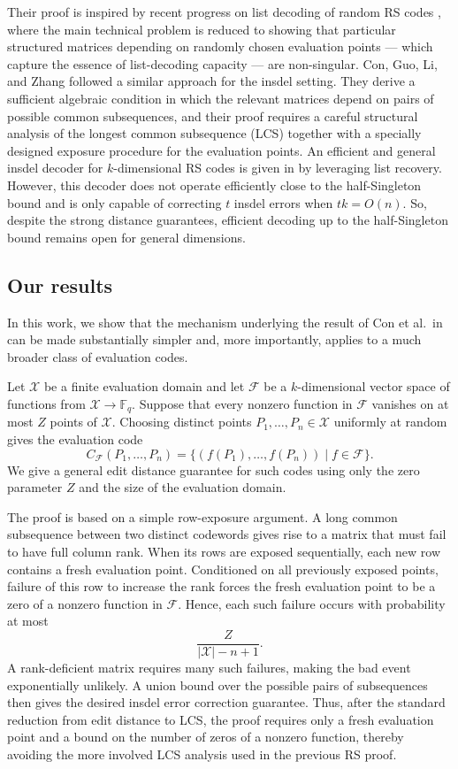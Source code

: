 \documentclass[draft, onecolumn, 11pt]{IEEEtran}
\newcommand{\F}{\mathbb{F}}
\begin{document}
Their proof is inspired by recent progress on list decoding of random RS codes \cite{brakensiek2023generic, GZ23, alrabiah2023randomly}, where the main technical problem is reduced to showing that particular structured matrices depending on randomly chosen evaluation points --- which capture the essence of list-decoding capacity --- are non-singular. Con, Guo, Li, and Zhang \cite{con2024randomRS} followed a similar approach for the insdel setting. They derive a sufficient algebraic condition in which the relevant matrices depend on pairs of possible common subsequences, and their proof requires a careful structural analysis of the longest common subsequence (LCS) together with a specially designed exposure procedure for the evaluation points. An efficient and general insdel decoder for $k$-dimensional RS codes is given in \cite{banerjee2025decoding} by leveraging list recovery. However, this decoder does not operate efficiently close to the half-Singleton bound and is only capable of correcting  $t$ insdel errors when $tk = O(n)$.
So, despite the strong distance guarantees, efficient decoding up to the half-Singleton bound remains open for general dimensions.

\subsection{Our results}
In this work, we show that the mechanism underlying the result of Con et al.\ in \cite{con2024randomRS} can be made substantially simpler and, more importantly, applies to a much broader class of evaluation codes.

Let $\mathcal{X}$ be a finite evaluation domain and let $\mathcal{F}$ be a $k$-dimensional vector space of functions from $\mathcal{X} \to \F_q$. Suppose that every nonzero function in $\mathcal{F}$ vanishes on at most $Z$ points of $\mathcal{X}$. Choosing distinct points $P_1, \dots, P_n \in \mathcal{X}$ uniformly at random gives the evaluation code
$$C_{\mathcal{F}}(P_1,\dots,P_n) =
\lbrace (f(P_1),\dots,f(P_n)) \mid f \in \mathcal{F} \rbrace.$$
We give a general edit distance guarantee for such codes using only the zero parameter $Z$ and the size of the evaluation domain.

The proof is based on a simple row-exposure argument. A long common subsequence between two distinct codewords gives rise to a matrix that must fail to have full column rank. When its rows are exposed sequentially, each new row contains a fresh evaluation point. Conditioned on all previously exposed points, failure of this row to increase the rank forces the fresh evaluation point to be a zero of a nonzero function in $\mathcal{F}$. Hence, each such failure occurs with probability at most
$$\frac{Z}{|\mathcal{X}|-n+1}.$$
A rank-deficient matrix requires many such failures, making the bad event exponentially unlikely. A union bound over the possible pairs of subsequences then gives the desired insdel error correction guarantee. Thus, after the standard reduction from edit distance to LCS, the proof requires only a fresh evaluation point and a bound on the number of zeros of a nonzero function, thereby avoiding the more involved LCS analysis used in the previous RS proof.
\end{document}
